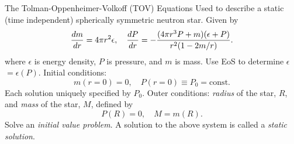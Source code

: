 \documentclass[]{beamer}
\newcommand{\Def}{\equiv}
\begin{document}
    \begin{frame}{The Tolman-Oppenheimer-Volkoff (TOV) Equations}
        \pause Used to describe a static (time independent) spherically symmetric neutron star. \pause Given by
        \begin{align*}
            \dv{m}{r} = 4\pi r^2 \epsilon, \quad \dv{P}{r} = -\frac{(4\pi r^3 P + m)(\epsilon + P)}{r^2 (1-2m/r)}.
        \end{align*}
        where $\epsilon$ is energy density, $P$ is pressure, and $m$ is mass. \pause Use EoS to determine $\epsilon~$\pause $=\epsilon(P)$. \pause Initial conditions: \pause
        \[m(r=0) = 0, \quad P(r=0) \Def P_0 = \text{const.}\]\pause
        Each solution uniquely specified by $P_0$. \pause Outer conditions: \pause \textit{radius} of the star, $R$\pause , and \textit{mass} of the star, $M$\pause , defined by \[P(R) = 0, \quad M = m(R).\] \pause
        Solve an \textit{initial value problem}. \pause A solution to the above system is called a \textit{static solution}.         %
    \end{frame}
\end{document}
